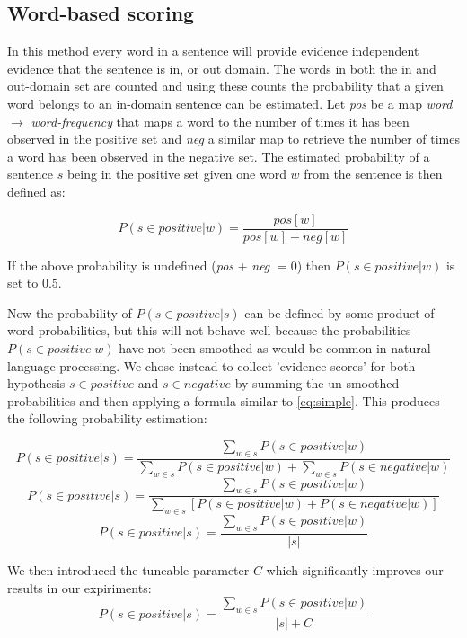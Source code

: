 \documentclass[11pt]{article}
\begin{document}
\subsection{Word-based scoring}
In this method every word in a sentence will provide evidence independent evidence that the sentence is in, or out domain. The words in both the in and out-domain set are counted and using these counts the probability that a given word belongs to an in-domain sentence can be estimated. Let \textit{pos} be a map \textit{word} $\rightarrow$ \textit{word-frequency} that maps a word to the number of times it has been observed in the positive set and \textit{neg} a similar map to retrieve the number of times a word has been observed in the negative set.
The estimated probability of a sentence $s$ being in the positive set given one word $w$ from the sentence is then defined as:

\begin{equation} \label{eq:simple}
P(s\in positive | w) = \frac{pos[w]}{pos[w] + neg[w]}
\end{equation}

If the above probability is undefined (\textit{pos} + \textit{neg} $= 0$) then $P(s\in positive | w)$ is set to $0.5$.

Now the probability of $P(s\in positive | s)$ can be defined by some product of word probabilities, but this will not behave well because the probabilities $P(s\in positive | w)$ have not been smoothed as would be common in natural language processing. We chose instead to collect 'evidence scores' for both hypothesis $s\in positive$ and $s\in negative$ by summing the un-smoothed probabilities and then applying a formula similar to \ref{eq:simple}. This produces the following probability estimation:

\begin{equation} P(s\in positive | s)  = \frac{\sum_{w\in s} P(s\in positive | w)}{\sum_{w\in s} P(s\in positive | w) + \sum_{w\in s} P(s\in negative | w)}  \end{equation}
\begin{equation} P(s\in positive | s)  = \frac{\sum_{w\in s} P(s\in positive | w)}{\sum_{w\in s} [ P(s\in positive | w) + P(s\in negative | w) ]}  \end{equation}
\begin{equation} P(s\in positive | s)  = \frac{\sum_{w\in s} P(s\in positive | w)}{ | s | }  \end{equation}

We then introduced the tuneable parameter $C$ which significantly improves our results in our expiriments:
\begin{equation} P(s\in positive | s)  = \frac{\sum_{w\in s} P(s\in positive | w)}{ | s | + C}  \end{equation}
\end{document}

